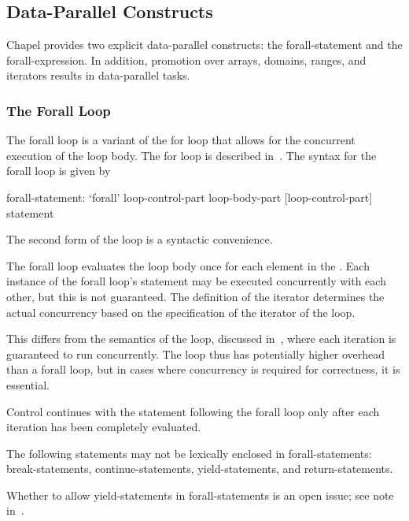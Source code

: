 \subsection{Data-Parallel Constructs}
\label{Data_Parallelism}

Chapel provides two explicit data-parallel constructs: the
forall-statement and the forall-expression.  In addition, promotion
over arrays, domains, ranges, and iterators results in data-parallel
tasks.

\subsubsection{The Forall Loop}
\label{Forall}

The forall loop is a variant of the for loop that allows for the
concurrent execution of the loop body. The for loop is described
in~. The syntax for the forall loop is given by
\begin{syntax}
forall-statement:
  `forall' loop-control-part loop-body-part
  [loop-control-part] statement
\end{syntax}
The second form of the loop is a syntactic convenience.

The forall loop evaluates the loop body once for each element in
the .  Each instance of the forall loop's
statement may be executed concurrently with each other, but this is
not guaranteed.  The definition of the iterator determines the actual
concurrency based on the specification of the iterator of the loop.

This differs from the semantics of the  loop, discussed
in~, where each iteration is guaranteed to run
concurrently.  The  loop thus has potentially higher
overhead than a forall loop, but in cases where concurrency is
required for correctness, it is essential.

Control continues with the statement following the forall loop only
after each iteration has been completely evaluated.

The following statements may not be lexically enclosed in
forall-statements: break-statements, continue-statements,
yield-statements, and return-statements.

\begin{openissue}
Whether to allow yield-statements in forall-statements is an open
issue; see note in~.
\end{openissue}

